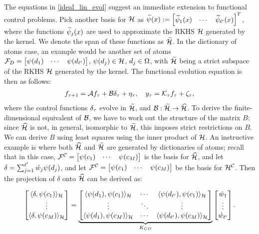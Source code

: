 The equations in \eqref{ideal_lin_evol} suggest an immediate extension to functional control problems. 
Pick another basis for $\mathcal{H}$ as $\widetilde{\psi}(x) := \begin{bmatrix}\widetilde{\psi}_1(x) &\cdots & \widetilde{\psi}_{\ell'}(x)
\end{bmatrix}^T$, where the functions $\widetilde{\psi}_j(x)$ are used to approximate the RKHS $\mathcal{H}$ generated by the kernel. We denote the span of these functions as $\widetilde{\mathcal{H}}$. In the dictionary of atoms case, an example would be another set of atoms
 $\mathcal{F}_{D} = \begin{bmatrix}\psi(d_1) &\cdots & \psi(d_{\ell'})
\end{bmatrix}$, $\psi(d_j)\in\mathcal{H}$, $d_j\in\Omega$, with $\widetilde{\mathcal{H}}$ being a strict subspace of the RKHS $\mathcal{H}$  generated by the kernel. 
The functional evolution equation is then as follows:
\begin{align}\eqlabel{ideal_lin_evol_control}
 f_{\tindex+1} = \sysop f_{\tindex} + \controlop \control_{\tindex} + \eta_{\tindex}, \quad y_{\tindex} = \measop_{\tindex} f_{\tindex} + \zeta_{\tindex},
\end{align}
where the control functions $\delta_{\tau}$ evolve in $\widetilde{\mathcal{H}}$, and $\mathcal{B}:\widetilde{\mathcal{H}}\to\widehat{\mathcal{H}}$. To derive the finite-dimensional equivalent of $\mathcal{B}$, we have to work out the structure of the matrix $B$: since $\widehat{\mathcal{H}}$ is not, in general, isomorphic to $\widetilde{\mathcal{H}}$, this imposes strict restrictions on $B$. We can derive $B$ using least squares using the inner product of $\mathcal{H}$. An instructive example is where both $\widehat{\mathcal{H}}$ and $\widetilde{\mathcal{H}}$ are generated by dictionaries of atoms; recall that in this case, $\mathcal{F}^{\mathcal{C}} = 
 \begin{bmatrix}\psi(c_1) &\cdots & \psi(c_{M})
\end{bmatrix}$ is the basis for $\widehat{\mathcal{H}}$, and let $\delta = \sum_{j=1}^{\ell'}\acute{w}_j\psi(d_j)$, and let $\mathcal{F}^{\mathcal{C}} = 
 \begin{bmatrix}\psi(c_1) &\cdots & \psi(c_{M})
\end{bmatrix}$ be the basis for $\mathcal{H}^{\mathcal{C}}$. Then the projection of $\delta$ onto $\widehat{\mathcal{H}}$ can be derived as: 


\begin{align}
 \begin{bmatrix}
  \langle \delta, \psi(c_1) \rangle_{\mathcal{H}}\\
   \vdots\\
  \langle \delta, \psi(c_{M}) \rangle_{\mathcal{H}} 
 \end{bmatrix}
 = 
 \underbrace{
 \begin{bmatrix}
  \langle \psi(d_1),\psi(c_1) \rangle_{\mathcal{H}} & \cdots & \langle \psi(d_{\ell'}),\psi(c_1) \rangle_{\mathcal{H}}\\
   \vdots  &\ddots &\vdots\\
  \langle \psi(d_1),\psi(c_{M}) \rangle_{\mathcal{H}} & \cdots & \langle \psi(d_{\ell'}),\psi(c_{M}) \rangle_{\mathcal{H}}
 \end{bmatrix}}_{K_{CD}}
  \begin{bmatrix}
   \acute{w}_1\\
   \vdots\\
   \acute{w}_{\ell'}
  \end{bmatrix}.
\end{align}


